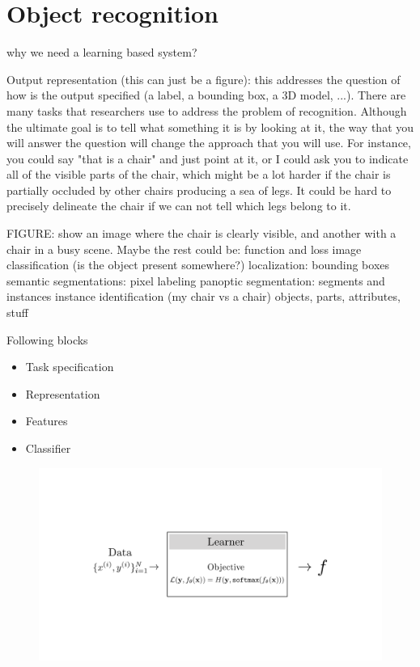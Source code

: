 
%	
%	
%	 
%

\chapter{Object recognition}

why we need a learning based system?

Output representation (this can  just  be a figure): this addresses the question of how is the output specified (a label, a bounding box, a 3D model, ...).
There  are many tasks that researchers use to address  the problem of recognition. Although  the ultimate goal is to tell what something it is by looking at it, the way that you will answer the question will change the approach that you will  use. For instance, you could say "that is a chair" and just point  at it, or I could ask you to indicate all of the visible parts of the chair, which might be a lot  harder if the chair is partially occluded by other chairs producing a sea of legs. It could be hard to precisely delineate the chair if we can not tell which legs belong to it.

FIGURE: show an image where the chair is clearly visible, and another with a chair in a busy  scene.
Maybe  the rest could be: function and loss
image classification (is the object present somewhere?)
localization: bounding boxes
semantic segmentations: pixel labeling
panoptic segmentation: segments and instances
instance identification (my chair vs a chair)
objects, parts, attributes, stuff



Following blocks
\begin{itemize}
	\item Task specification
	\item Representation
	\item Features
	\item Classifier
\end{itemize}


\begin{figure}[h]
	\centering
	\includegraphics[width=0.7\linewidth]{./figures/intro_to_learning/softmax_regression_learning_problem.pdf}
	\label{fig:softmax_regression_learning_problem}
\end{figure}


